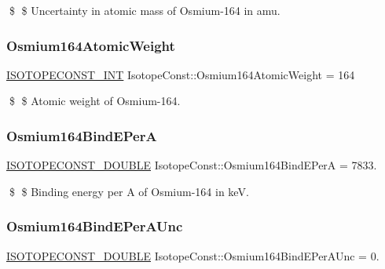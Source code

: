 \$ \$ Uncertainty in atomic mass of Osmium-\/164 in amu. \mbox{\label{group___isotope_const-_osmium-_os164_ga76baada9015d5b9f4cbab5fa8c189fee}} 
\subsubsection{\texorpdfstring{Osmium164\+Atomic\+Weight}{Osmium164AtomicWeight}}
{\footnotesize\ttfamily \mbox{\hyperlink{group___isotope_const-_macros_ga5f18360b3e99483a35c32d789e62621c}{I\+S\+O\+T\+O\+P\+E\+C\+O\+N\+S\+T\+\_\+\+I\+NT}} Isotope\+Const\+::\+Osmium164\+Atomic\+Weight = 164}

\$ \$ Atomic weight of Osmium-\/164. \mbox{\label{group___isotope_const-_osmium-_os164_ga6780c4e188e6a5d4ee27528c8be8f475}} 
\subsubsection{\texorpdfstring{Osmium164\+Bind\+E\+PerA}{Osmium164BindEPerA}}
{\footnotesize\ttfamily \mbox{\hyperlink{group___isotope_const-_macros_ga8f45a7272ce02c0b4c65c44636ed719a}{I\+S\+O\+T\+O\+P\+E\+C\+O\+N\+S\+T\+\_\+\+D\+O\+U\+B\+LE}} Isotope\+Const\+::\+Osmium164\+Bind\+E\+PerA = 7833.}

\$ \$ Binding energy per A of Osmium-\/164 in keV. \mbox{\label{group___isotope_const-_osmium-_os164_ga3e174cdea21eac3b6916039cec0ab362}} 
\subsubsection{\texorpdfstring{Osmium164\+Bind\+E\+Per\+A\+Unc}{Osmium164BindEPerAUnc}}
{\footnotesize\ttfamily \mbox{\hyperlink{group___isotope_const-_macros_ga8f45a7272ce02c0b4c65c44636ed719a}{I\+S\+O\+T\+O\+P\+E\+C\+O\+N\+S\+T\+\_\+\+D\+O\+U\+B\+LE}} Isotope\+Const\+::\+Osmium164\+Bind\+E\+Per\+A\+Unc = 0.}

